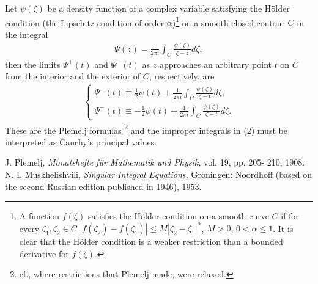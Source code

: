 \documentclass[12pt]{article}
\begin{document}
Let $\psi(\zeta)$ be a density function of a complex variable satisfying the H\"older condition (the Lipschitz condition of order $\alpha$){\footnote{A function $f(\zeta)$ satisfies the H\"older condition on a smooth curve $C$ if for every $\zeta_1,\zeta_2\in C$ $|f(\zeta_2)-f(\zeta_1)|\leq M|\zeta_2-\zeta_1|^\alpha$, $M>0$, $0<\alpha\leq 1$. It is clear that the H\"older condition is a weaker restriction than a bounded derivative for $f(\zeta)$.}} on a smooth closed contour $C$ in the integral
\begin{align}
\Psi(z)=\frac{1}{2\pi i}\int_C\frac{\psi(\zeta)}{\zeta-z}d\zeta,
\end{align}
then the limits $\Psi^+(t)$ and $\Psi^-(t)$ as $z$ approaches an arbitrary point $t$ on $C$ from the interior and the exterior of $C$, respectively, are
\begin{align}
\left\{ \begin{array}{ll}
\Psi^+(t) \equiv \frac{1}{2}\psi(t)+
\frac{1}{2\pi i}\int_C\frac{\psi(\zeta)}{\zeta-t}d\zeta, \\ 
\Psi^-(t) \equiv -\frac{1}{2}\psi(t)+
\frac{1}{2\pi i}\int_C\frac{\psi(\zeta)}{\zeta-t}d\zeta.
\end{array}
\right.
\end{align}
These are the Plemelj\cite{cite:Plemelj} formulas {\footnote{cf.\cite{cite:Musk}, where restrictions that Plemelj made, were relaxed.}}  and the improper integrals in (2) must be interpreted as Cauchy's principal values.
\begin{thebibliography}{99}
J. Plemelj, {\em Monatshefte f\"ur Mathematik und Physik,} vol. 19, pp. 205- 210, 1908.
N. I. Muskhelishvili, {\em Singular Integral Equations,} Groningen: Noordhoff (based on the second Russian edition published in 1946), 1953.
\end{thebibliography} 
	


  
\end{document}
